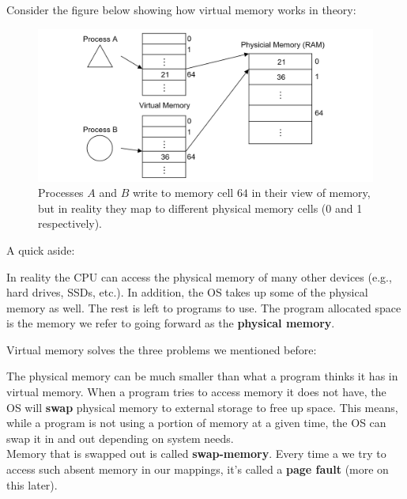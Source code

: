 \newpage 

\noindent
Consider the figure below showing how virtual memory works in theory:

\begin{figure}[h]
    \centering
    \includegraphics[width=\textwidth]{Sections/virt/virt.png}
    
    \vspace{1em}
    \caption{Processes $A$ and $B$ write to memory cell $64$ in their view of memory, but in reality they map 
    to different physical memory cells (0 and 1 respectively).}
    
    \label{fig:virt2}
\end{figure}

\noindent
A quick aside:

\begin{theo}

    In reality the CPU can access the physical memory of many other devices (e.g., hard drives, SSDs, etc.). In 
    addition, the OS takes up some of the physical memory as well. The rest is left to programs to use. The 
    program allocated space is the memory we refer to going forward as the \textbf{physical memory}.
\end{theo}

\noindent
Virtual memory solves the three problems we mentioned before:
\begin{Def}

    The physical memory can be much smaller than what a program thinks it has in virtual memory. When a program tries to access memory 
    it does not have, the OS will \textbf{swap} physical memory to external storage to free up space. This means, while a program is not using 
    a portion of memory at a given time, the OS can swap it in and out depending on system needs.\\

    \noindent
    Memory that is swapped out is called \textbf{swap-memory}. Every time a we try to access such absent memory 
    in our mappings, it's called a \textbf{page fault} (more on this later).
\end{Def}

